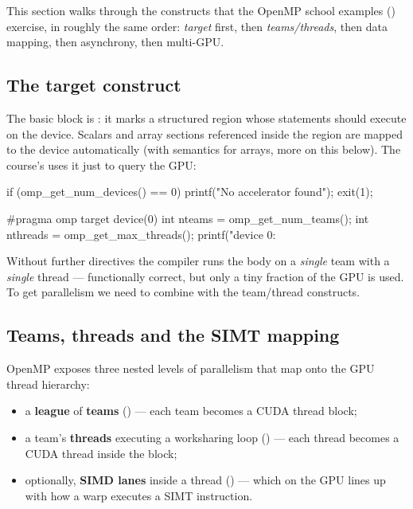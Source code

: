 This section walks through the constructs that the OpenMP school examples () exercise, in roughly the same order: \emph{target} first, then \emph{teams/threads}, then data mapping, then asynchrony, then multi-GPU.

\subsection{The target construct}

The basic block is : it marks a structured region whose statements should execute on the device. Scalars and array sections referenced inside the region are mapped to the device automatically (with  semantics for arrays, more on this below). The course's  uses it just to query the GPU:

\begin{codeblock}[language=C]
if (omp_get_num_devices() == 0) {
    printf("No accelerator found\n"); exit(1);
}

#pragma omp target device(0)
{
    int nteams   = omp_get_num_teams();
    int nthreads = omp_get_max_threads();
    printf("device 0: %
}
\end{codeblock}

Without further directives the compiler runs the body on a \emph{single} team with a \emph{single} thread --- functionally correct, but only a tiny fraction of the GPU is used. To get parallelism we need to combine  with the team/thread constructs.

\subsection{Teams, threads and the SIMT mapping}

OpenMP exposes three nested levels of parallelism that map onto the GPU thread hierarchy:

\begin{itemize}
    \item a \textbf{league} of \textbf{teams} () --- each team becomes a CUDA thread block;
    \item a team's \textbf{threads} executing a worksharing loop () --- each thread becomes a CUDA thread inside the block;
    \item optionally, \textbf{SIMD lanes} inside a thread () --- which on the GPU lines up with how a warp executes a SIMT instruction.
\end{itemize}

